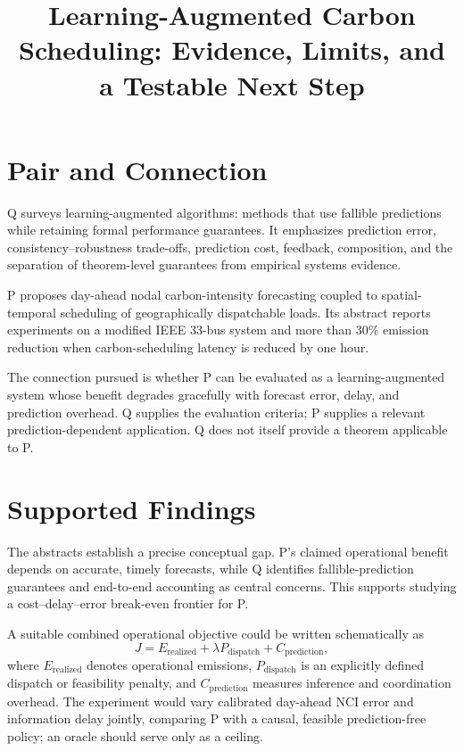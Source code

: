\documentclass{article}
\title{Learning-Augmented Carbon Scheduling: Evidence, Limits, and a Testable Next Step}
\begin{document}
\maketitle

\section{Pair and Connection}

Q surveys learning-augmented algorithms: methods that use fallible predictions while retaining formal performance guarantees. It emphasizes prediction error, consistency--robustness trade-offs, prediction cost, feedback, composition, and the separation of theorem-level guarantees from empirical systems evidence.

P proposes day-ahead nodal carbon-intensity forecasting coupled to spatial-temporal scheduling of geographically dispatchable loads. Its abstract reports experiments on a modified IEEE 33-bus system and more than \(30\%\) emission reduction when carbon-scheduling latency is reduced by one hour.

The connection pursued is whether P can be evaluated as a learning-augmented system whose benefit degrades gracefully with forecast error, delay, and prediction overhead. Q supplies the evaluation criteria; P supplies a relevant prediction-dependent application. Q does not itself provide a theorem applicable to P.

\section{Supported Findings}

The abstracts establish a precise conceptual gap. P's claimed operational benefit depends on accurate, timely forecasts, while Q identifies fallible-prediction guarantees and end-to-end accounting as central concerns. This supports studying a cost--delay--error break-even frontier for P.

A suitable combined operational objective could be written schematically as
\[
J = E_{\mathrm{realized}} + \lambda P_{\mathrm{dispatch}} + C_{\mathrm{prediction}},
\]
where \(E_{\mathrm{realized}}\) denotes operational emissions, \(P_{\mathrm{dispatch}}\) is an explicitly defined dispatch or feasibility penalty, and \(C_{\mathrm{prediction}}\) measures inference and coordination overhead. The experiment would vary calibrated day-ahead NCI error and information delay jointly, comparing P with a causal, feasible prediction-free policy; an oracle should serve only as a ceiling.
\end{document}
